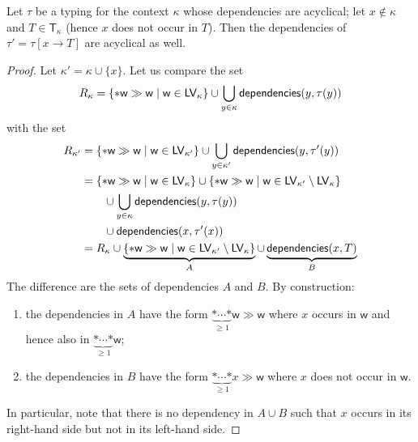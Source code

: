 \begin{lemma}\label{lem:declare_invariant}
  Let $\tau$ be a typing for the context $\kappa$ whose dependencies
  are acyclical; let $x\not\in\kappa$ and $T\in\mathsf{T}_\kappa$ (hence $x$ does not occur in $T$).
  Then the dependencies of $\tau'=\tau[x\to T]$ are acyclical as well.
\end{lemma}
\begin{proof}
  Let $\kappa'=\kappa\cup\{x\}$.
  Let us compare the set
  \[
  R_\kappa=\{\mathtt{*}\mathsf{w}\gg\mathsf{w}\mid\mathsf{w}\in\mathsf{LV}_\kappa\}
  \cup\bigcup\limits_{y\in\kappa}\mathsf{dependencies}(y,\tau(y))
  \]
  with the set
  \begin{align*}
  R_{\kappa'}&=\{\mathtt{*}\mathsf{w}\gg\mathsf{w}\mid\mathsf{w}\in\mathsf{LV}_{\kappa'}\}
  \cup\bigcup\limits_{y\in\kappa'}\mathsf{dependencies}(y,\tau'(y))\\
  &=\{\mathtt{*}\mathsf{w}\gg\mathsf{w}\mid\mathsf{w}\in\mathsf{LV}_\kappa\}
  \cup\{\mathtt{*}\mathsf{w}\gg\mathsf{w}\mid\mathsf{w}\in\mathsf{LV}_{\kappa'}\setminus
  \mathsf{LV}_{\kappa}\}\\
  &\qquad\cup\bigcup\limits_{y\in\kappa}\mathsf{dependencies}(y,\tau(y))\\
  &\qquad\cup\mathsf{dependencies}(x,\tau'(x))\\
  &=R_\kappa\cup\underbrace{\{\mathtt{*}\mathsf{w}\gg\mathsf{w}\mid\mathsf{w}\in\mathsf{LV}_{\kappa'}\setminus
  \mathsf{LV}_{\kappa}\}}_A\cup\underbrace{\mathsf{dependencies}(x,T)}_B\\
  \end{align*}
  The difference are the sets of dependencies $A$ and $B$. By construction:
  \begin{enumerate}
  \item the dependencies in
    $A$ have the form $\underbrace{\mathtt{*}\cdots\mathtt{*}}_{\ge 1}\mathsf{w}\gg\mathsf{w}$ where $x$ occurs in $\mathsf{w}$ and hence
    also in $\underbrace{\mathtt{*}\cdots\mathtt{*}}_{\ge 1}\mathsf{w}$;
  \item the dependencies in $B$ have the form
    $\underbrace{\mathtt{*}\cdots\mathtt{*}}_{\ge 1}x\gg\mathsf{w}$ where $x$ does not occur
    in $\mathsf{w}$.
  \end{enumerate}
  In particular, note that there is no dependency in $A\cup B$ such that
  $x$ occurs in its right-hand side but not in its left-hand side.


\end{proof}
